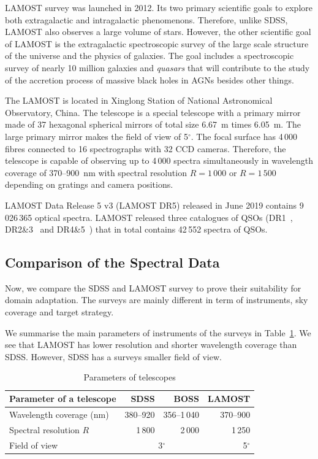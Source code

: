LAMOST survey was launched in 2012.
Its two primary scientific goals to explore both extragalactic and intragalactic phenomenons.
Therefore, unlike SDSS, LAMOST also observes a large volume of stars.
However, the other scientific goal of LAMOST is the extragalactic spectroscopic survey of the large scale structure of the universe and the physics of galaxies.
The goal includes a spectroscopic survey of nearly 10 million galaxies and \textit{quasars}
that will contribute to the study of the accretion process of massive black holes in AGNs besides other things.~\cite{cui2012}

The LAMOST is located in Xinglong Station of National Astronomical Observatory, China.
The telescope is a special telescope with a primary mirror made of 37 hexagonal spherical mirrors of total size 6.67~m times 6.05~m.
The large primary mirror makes the field of view of 5\(^{\circ}\).
The focal surface has 4\,000 fibres connected to 16 spectrographs with 32 CCD cameras.
Therefore, the telescope is capable of observing up to 4\,000 spectra simultaneously
in wavelength coverage of 370--900~nm with spectral resolution \(R = 1\,000\) or \(R = 1\,500\) depending on gratings and camera positions.~\cite{cui2012}

LAMOST Data Release 5 v3 (LAMOST DR5) released in June 2019
contains 9\,026\,365 optical spectra.
LAMOST released three catalogues of QSOs
(DR1~\cite{ai2016}, DR2\&3~\cite{dong2018} and DR4\&5~\cite{yao2019})
that in total contains 42\,552 spectra of QSOs.

\subsection{Comparison of the Spectral Data}
\label{comparison}

Now, we compare the SDSS and LAMOST survey to prove their suitability for domain adaptation.
The surveys are mainly different in term of instruments, sky coverage and target strategy.

We summarise the main parameters of instruments of the surveys in Table~\ref{telescopes_parameters}.
We see that LAMOST has lower resolution and shorter wavelength coverage than SDSS.
However, SDSS has a surveys smaller field of view.

\begin{table}
\begin{center}
\begin{tabular}{|l|r|r|r|}
	\hline
	Parameter of a telescope & SDSS & BOSS & LAMOST \\
	\hline \hline
	Wavelength coverage (nm) & 380--920 & 356--1\,040 & 370--900 \\ \hline
	Spectral resolution \(R\) & 1\,800 & 2\,000 & 1\,250 \\ \hline
	Field of view & \multicolumn{2}{c|}{3\(^{\circ}\)} & 5\(^{\circ}\) \\ \hline
\end{tabular}
\end{center}
\caption{Parameters of telescopes}
\label{telescopes_parameters}
\end{table}

